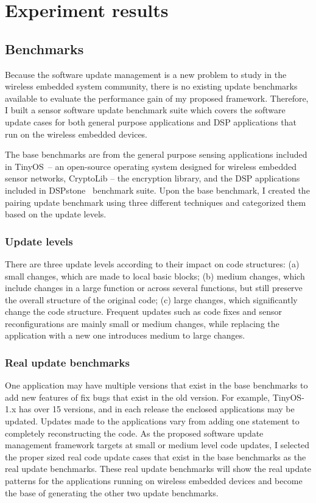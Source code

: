 \chapter{Experiment results}


\section{Benchmarks}
Because the software update management is a new problem to study
in the wireless embedded system community, there is no existing
update benchmarks available to evaluate the performance gain
of my proposed framework.
Therefore, I built a sensor software update benchmark suite
which covers the software update cases for both general purpose
applications and DSP applications that run on the wireless
embedded devices.

The base benchmarks are from the general purpose
sensing applications included in TinyOS~\cite{tinyos}--
an open-source operating system designed for wireless embedded
sensor networks, CryptoLib -- the encryption library, and the DSP applications included in 
DSPstone~\cite{dspstone} benchmark suite. 
Upon the base benchmark, I created the pairing update benchmark
using three different techniques and categorized them based on the update levels.

\subsection{Update levels}
There are three update levels according to their
impact on code structures: (a) small changes, which are made to local
basic blocks; (b) medium changes, which include changes in a large
function or across several functions, but still preserve the overall
structure of the original code; (c) large changes, which significantly
change the code structure. Frequent updates such as code fixes and
sensor reconfigurations are mainly small or medium changes, while
replacing the application with a new one introduces medium to large
changes. 

\subsection{Real update benchmarks}
One application may have multiple versions that exist in the
base benchmarks to add new features of fix bugs that exist 
in the old version.
For example, TinyOS-1.x has over 15 versions, and in each release
the enclosed applications may be updated.
Updates made to the applications vary from adding one statement
to completely reconstructing the code.
As the proposed software update management framework targets
at small or medium level code updates, I selected the proper sized real code
update cases that exist in the base benchmarks as the real update
benchmarks.
These real update benchmarks will show the real update patterns
for the applications running on wireless embedded devices and
become the base of generating the other two update benchmarks.

